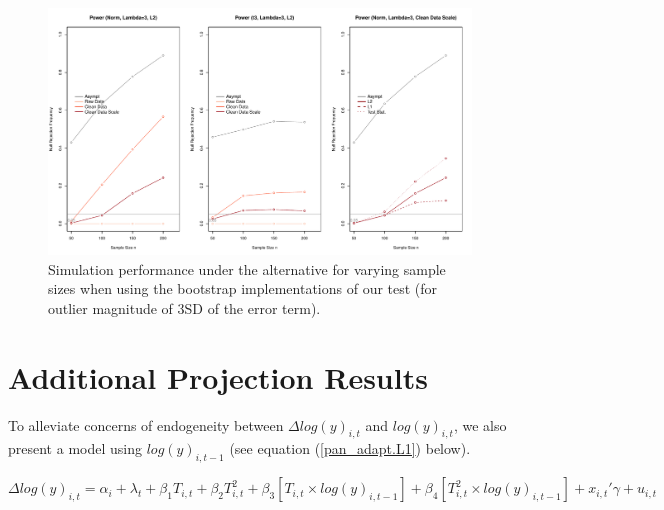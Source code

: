 \documentclass[11pt, letterpaper]{article}
\numberwithin{algorithm}{section}
\numberwithin{assumption}{section}
\numberwithin{lemma}{section}
\numberwithin{theorem}{section}
\numberwithin{corollary}{section}
\numberwithin{remark}{section}
\numberwithin{equation}{section}
\numberwithin{figure}{section}
\numberwithin{table}{section}
\begin{document}
\begin{figure}[!htbp]  %
\centering
\includegraphics[scale=0.5]{boot_alt_lambda3.pdf}
\caption{Simulation performance under the alternative for varying sample sizes when using the bootstrap implementations of our test (for outlier magnitude of 3SD of the error term).}
\label{fig_out_sim_alt_boot3}
\end{figure}


\clearpage
\section{Additional Projection Results} \label{sec_add_proj}

To alleviate concerns of endogeneity between $\Delta log(y)_{i,t}$ and $log(y)_{i, t}$, we also present a model using $log(y)_{i, t-1}$ (see equation (\ref{pan_adapt.L1}) below).

\begin{small}
\begin{equation}
\label{pan_adapt.L1}
\Delta log(y)_{i,t} = \alpha_i + \lambda_t + \beta_1 T_{i,t} + \beta_2 T^2_{i,t} + \beta_3 \left[ T_{i,t} \times  log(y)_{i, t-1} \right] + \beta_4 \left[  T^2_{i,t} \times  log(y)_{i, t-1} \right] + x_{i,t}'\gamma + u_{i,t}
\end{equation}
\end{small}
\end{document}
